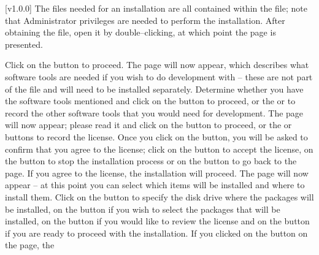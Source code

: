 [v1.0.0]
The files needed for an \mplusm{} installation are all contained within the
 file; note that Administrator privileges are needed to perform the
installation.
After obtaining the  file, open it by double--clicking, at which point the
 page is presented.

Click on the  button to proceed.
\newpage
The  page will now appear, which describes what software tools are
needed if you wish to do development with \mplusm{} -- these are not part of the
 file and will need to be installed separately.
Determine whether you have the software tools mentioned and click on the
 button to proceed, or the  or
 to record the other software tools that you would need for
development.
\newpage
The  page will now appear; please read it and click on the
 button to proceed, or the  or
 buttons to record the license.
Once you click on the  button, you will be asked to confirm that you
agree to the license; click on the  button to accept the license, on the
 button to stop the installation process or on the
 button to go back to the  page.
If you agree to the license, the installation will proceed.
\newpage
The  page will now appear -- at this point you can select
which items will be installed and where to install them.
Click on the  button to specify the disk
drive where the \mplusm{} packages will be installed, on the  button
if you wish to select the packages that will be installed, on the 
button if you would like to review the license and on the  button if
you are ready to proceed with the installation.
\newpage
If you clicked on the  button on the
 page, the\\
